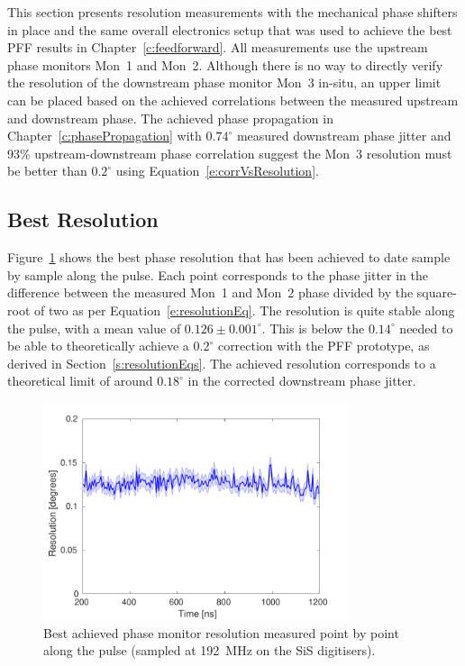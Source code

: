 
This section presents resolution measurements with the mechanical phase shifters in place and the same overall electronics setup that was used to achieve the best PFF results in Chapter~\ref{c:feedforward}. All measurements use the upstream phase monitors Mon~1 and Mon~2. Although there is no way to directly verify the resolution of the downstream phase monitor Mon~3 in-situ, an upper limit can be placed based on the achieved correlations between the measured upstream and downstream phase. The achieved phase propagation in Chapter~\ref{c:phasePropagation} with \(0.74^\circ\) measured downstream phase jitter and 93\% upstream-downstream phase correlation suggest the Mon~3 resolution must be better than \(0.2^\circ\) using Equation~\ref{e:corrVsResolution}.

\subsection{Best Resolution}
\label{ss:bestRes}

Figure~\ref{f:bestResolution} shows the best phase resolution that has been achieved to date sample by sample along the pulse. Each point corresponds to the phase jitter in the difference between the measured Mon~1 and Mon~2 phase divided by the square-root of two as per Equation~\ref{e:resolutionEq}.  The resolution is quite stable along the pulse, with a mean value of \(0.126\pm0.001^\circ\). This is below the \(0.14^\circ\) needed to be able to theoretically achieve a \(0.2^\circ\) correction with the PFF prototype, as derived in Section~\ref{s:resolutionEqs}. The achieved resolution corresponds to a theoretical limit of around \(0.18^\circ\) in the corrected downstream phase jitter.

\begin{figure}
  \centering
  \includegraphics[width=0.8\textwidth]{Figures/phaseMons/bestResolution}
  \caption{Best achieved phase monitor resolution measured point by point along the pulse (sampled at 192~MHz on the SiS digitisers).}
  \label{f:bestResolution}
\end{figure}

